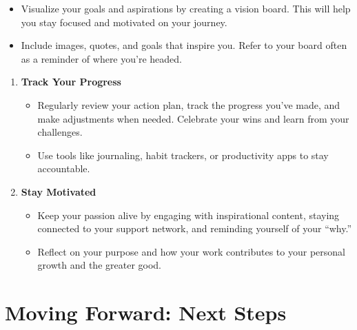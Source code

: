 \documentclass[
  letterpaper,
  DIV=11,
  numbers=noendperiod]{scrreprt}
\providecommand{\tightlist}{%
  \setlength{\itemsep}{0pt}\setlength{\parskip}{0pt}}\usepackage{longtable,booktabs,array}
\begin{document}
\begin{itemize}
\tightlist
\item
  Visualize your goals and aspirations by creating a vision board. This
  will help you stay focused and motivated on your journey.
\item
  Include images, quotes, and goals that inspire you. Refer to your
  board often as a reminder of where you're headed.
\end{itemize}

\begin{enumerate}
\def\labelenumi{\arabic{enumi}.}
\setcounter{enumi}{1}
\item
  \textbf{Track Your Progress}

  \begin{itemize}
  \tightlist
  \item
    Regularly review your action plan, track the progress you've made,
    and make adjustments when needed. Celebrate your wins and learn from
    your challenges.
  \item
    Use tools like journaling, habit trackers, or productivity apps to
    stay accountable.
  \end{itemize}
\item
  \textbf{Stay Motivated}

  \begin{itemize}
  \tightlist
  \item
    Keep your passion alive by engaging with inspirational content,
    staying connected to your support network, and reminding yourself of
    your ``why.''
  \item
    Reflect on your purpose and how your work contributes to your
    personal growth and the greater good.
  \end{itemize}
\end{enumerate}

\section{Moving Forward: Next Steps}\label{moving-forward-next-steps}
\end{document}
